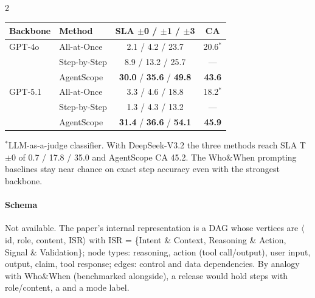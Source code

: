 \begin{multicols}{2}
\begin{center}\small
\begin{tabular}{@{}llcc@{}}\toprule
Backbone & Method & SLA $\pm$0 / $\pm$1 / $\pm$3 & CA\\\midrule
GPT-4o & All-at-Once & 2.1 / 4.2 / 23.7 & 20.6$^*$\\
 & Step-by-Step & 8.9 / 13.2 / 25.7 & ---\\
 & AgentScope & \textbf{30.0} / \textbf{35.6} / \textbf{49.8} & \textbf{43.6}\\
GPT-5.1 & All-at-Once & 3.3 / 4.6 / 18.8 & 18.2$^*$\\
 & Step-by-Step & 1.3 / 4.3 / 13.2 & ---\\
 & AgentScope & \textbf{31.4} / \textbf{36.6} / \textbf{54.1} & \textbf{45.9}\\\bottomrule
\end{tabular}
\end{center}
$^*$LLM-as-a-judge classifier. With DeepSeek-V3.2 the three methods reach SLA T$\pm$0 of 0.7 / 17.8 / 35.0 and AgentScope CA 45.2. The Who\&When prompting baselines stay near chance on exact step accuracy even with the strongest backbone.

\paragraph{Schema} Not available. The paper's internal representation is a DAG whose vertices are $\langle$id, role, content, ISR$\rangle$ with ISR = \{Intent \& Context, Reasoning \& Action, Signal \& Validation\}; node types: reasoning, action (tool call/output), user input, output, claim, tool response; edges: control and data dependencies. By analogy with Who\&When (benchmarked alongside), a release would hold steps with role/content, a  and a mode label.
\end{multicols}

